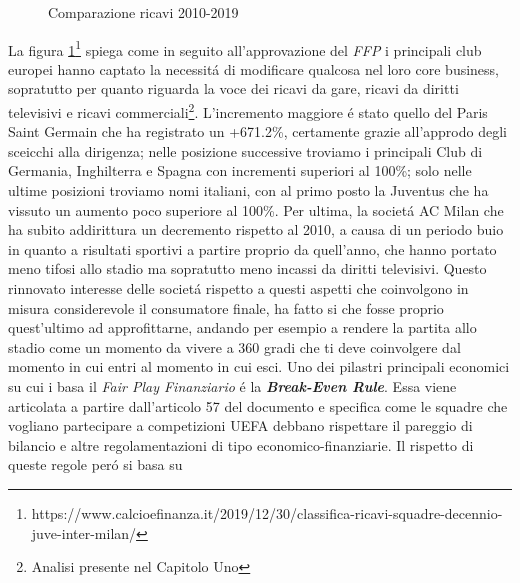 \documentclass[
    corpo=12pt,
    oneside,
    evenboxes,
    tipotesi=triennale,
    stile=classica,
    oldstyle,
    autoretitolo,
    greek,
]{toptesi}
\begin{document}
\begin{interlinea}{1.5}
\begin{figure}
    \caption{Comparazione ricavi 2010-2019}
    \label{comp_ricavi_10_19}  
\end{figure}
La figura \ref{comp_ricavi_10_19}\footnote{https://www.calcioefinanza.it/2019/12/30/classifica-ricavi-squadre-decennio-juve-inter-milan/}
spiega come in seguito all'approvazione del \emph{FFP} i principali club europei hanno captato la necessit\'a di modificare qualcosa nel loro core business,
sopratutto per quanto riguarda la voce dei ricavi da gare, ricavi da diritti televisivi e ricavi commerciali\footnote{Analisi presente nel Capitolo Uno}.
L'incremento maggiore \'e stato quello del Paris Saint Germain che ha registrato un +671.2\%, certamente
grazie all'approdo degli sceicchi alla dirigenza; nelle posizione successive troviamo i principali Club di Germania, Inghilterra e Spagna
con incrementi superiori al 100\%; solo nelle ultime posizioni troviamo nomi italiani, con al primo posto la Juventus che ha vissuto un aumento 
poco superiore al 100\%. Per ultima, la societ\'a AC Milan che ha subito addirittura un decremento rispetto al 2010,
a causa di un periodo buio in quanto a risultati sportivi a partire proprio da quell'anno, che hanno portato meno tifosi allo stadio ma sopratutto meno incassi 
da diritti televisivi.\newline
Questo rinnovato interesse delle societ\'a rispetto a questi aspetti che coinvolgono in misura considerevole il consumatore finale, ha fatto
si che fosse proprio quest'ultimo ad approfittarne, andando per esempio a rendere la partita allo stadio come
un momento da vivere a 360 gradi che ti deve coinvolgere dal momento in cui entri al momento in cui esci.\newline
Uno dei pilastri principali economici su cui i basa il \emph{Fair Play Finanziario} \'e la \emph{\textbf{Break-Even Rule}}.
Essa viene articolata a partire dall'articolo 57 del documento e specifica come le squadre che vogliano partecipare a competizioni UEFA debbano
rispettare il pareggio di bilancio e altre regolamentazioni di tipo economico-finanziarie. Il rispetto di queste regole per\'o si basa su 

\end{interlinea}
\end{document}

